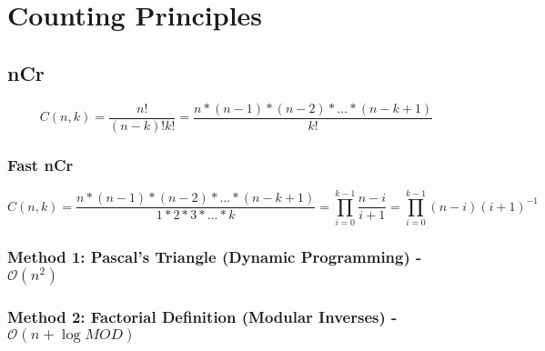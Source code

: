 \section{Counting Principles}
	\subsection{nCr}
		\[
		C(n,k) = \dfrac{n!}{(n-k)!k!} = \dfrac{n*(n-1)*(n-2)*\ldots*(n-k+1)}{k!}
		\]

		\subsubsection{Fast nCr}
			\[
			C(n,k) = \dfrac{n*(n-1)*(n-2)*\ldots*(n-k+1)}{1*2*3*\ldots*k} = \prod\limits_{i=0}^{k-1} \dfrac{n-i}{i+1} = \prod\limits_{i=0}^{k-1} (n-i)(i+1)^{-1}
    			\]

         \subsubsection{Method 1: Pascal's Triangle (Dynamic Programming) - $\mathcal{O}(n^2)$}

         \subsubsection{Method 2: Factorial Definition (Modular Inverses) - $\mathcal{O}(n + \log MOD)$}
